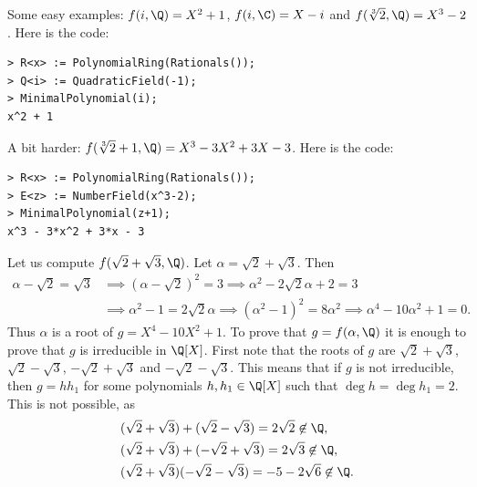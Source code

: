 Some easy examples: $f(i,\Q)=X^2+1$, 
$f(i,\C)=X-i$ and 
$f(\sqrt[3]{2},\Q)=X^3-2$. Here is the code:  
\begin{lstlisting}
> R<x> := PolynomialRing(Rationals());
> Q<i> := QuadraticField(-1);
> MinimalPolynomial(i);
x^2 + 1
\end{lstlisting}
A bit harder: $f(\sqrt[3]{2}+1,\Q)=X^3 - 3X^2 + 3X - 3$. Here is the code: 
\begin{lstlisting}
> R<x> := PolynomialRing(Rationals());
> E<z> := NumberField(x^3-2);
> MinimalPolynomial(z+1);
x^3 - 3*x^2 + 3*x - 3
\end{lstlisting}


\begin{example}
	Let us compute 
	$f(\sqrt{2}+\sqrt{3},\Q)$. Let $\alpha=\sqrt{2}+\sqrt{3}$. 
	Then 
	\begin{align*}
		\alpha-\sqrt{2}=\sqrt{3} & \implies 
		(\alpha-\sqrt{2})^2=3 \implies \alpha^2-2\sqrt{2}\alpha+2=3\\
		&\implies \alpha^2-1=2\sqrt{2}\alpha \implies
		(\alpha^2-1)^2=8\alpha^2\implies
		\alpha^4-10\alpha^2+1=0.
	\end{align*}
	Thus $\alpha$ is a root of $g=X^4-10X^2+1$. To prove that $g=f(\alpha,\Q)$ 
	it is enough to prove that 
	$g$ is irreducible in $\Q[X]$. First note that 
	the roots
	of $g$ are $\sqrt{2}+\sqrt{3}$, $\sqrt{2}-\sqrt{3}$, 
	$-\sqrt{2}+\sqrt{3}$ and $-\sqrt{2}-\sqrt{3}$. This means that
	if $g$ is not irreducible, 
	then $g=hh_1$ for some polynomials $h,h_1\in\Q[X]$ such that
	$\deg h=\deg h_1=2$. This is not possible, as 
	\begin{align*}
   & (\sqrt{2}+\sqrt{3})+(\sqrt{2}-\sqrt{3})=2\sqrt{2}\not\in\Q,\\
   & (\sqrt{2}+\sqrt{3})+(-\sqrt{2}+\sqrt{3})=2\sqrt{3}\not\in\Q,\\ 
   & (\sqrt{2}+\sqrt{3})(-\sqrt{2}-\sqrt{3})=-5-2\sqrt{6}\not\in\Q.
    \end{align*}
\end{example}



